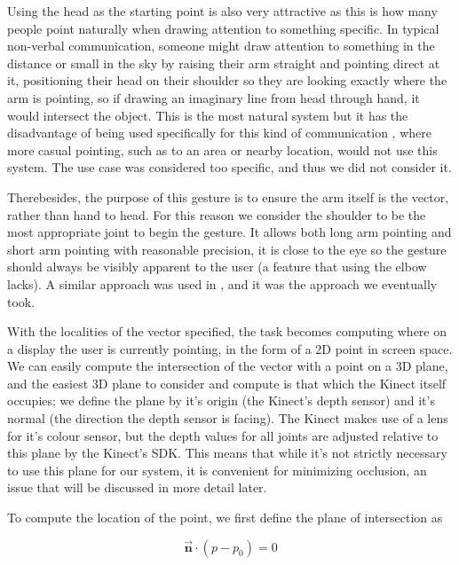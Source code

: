 Using the head as the starting point is also very attractive as this is how many people point naturally when drawing attention to something specific. In typical non-verbal communication, someone might draw attention to something in the distance or small in the sky by raising their arm straight and pointing direct at it, positioning their head on their shoulder so they are looking exactly where the arm is pointing, so if drawing an imaginary line from head through hand, it would intersect the object. This is the most natural system but it has the disadvantage of being used specifically for this kind of communication \cite{Argyle1998}, where more casual pointing, such as to an area or nearby location, would not use this system. The use case was considered too specific, and thus we did not consider it.

Therebesides, the purpose of this gesture is to ensure the arm itself is the vector, rather than hand to head. For this reason we consider the shoulder to be the most appropriate joint to begin the gesture. It allows both long arm pointing and short arm pointing with reasonable precision, it is close to the eye so the gesture should always be visibly apparent to the user (a feature that using the elbow lacks). A similar approach was used in \cite{FukumotoEtAl1994}, and it was the approach we eventually took.

With the localities of the vector specified, the task becomes computing where on a display the user is currently pointing, in the form of a 2D point in screen space. We can easily compute the intersection of the vector with a point on a 3D plane, and the easiest 3D plane to consider and compute is that which the Kinect itself occupies; we define the plane by it's origin (the Kinect's depth sensor) and it's normal (the direction the depth sensor is facing). The Kinect makes use of a lens for it's colour sensor, but the depth values for all joints are adjusted relative to this plane by the Kinect's SDK. This means that while it's not strictly necessary to use this plane for our system, it is convenient for minimizing occlusion, an issue that will be discussed in more detail later.


To compute the location of the point, we first define the plane of intersection as

\begin{equation}
\mathbf{\vec{n}} \cdot (p - p_0) = 0 
\end{equation}

